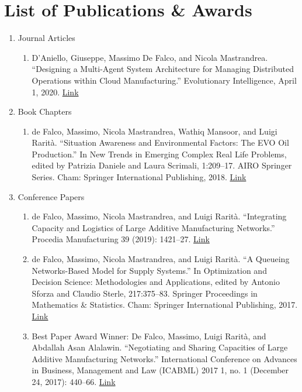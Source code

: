 \chapter*{List of Publications \& Awards}
\begin{enumerate}
    \item Journal Articles
        \begin{enumerate}
            \item D’Aniello, Giuseppe, Massimo De Falco, and Nicola Mastrandrea. “Designing a Multi-Agent System Architecture for Managing Distributed Operations within Cloud Manufacturing.” Evolutionary Intelligence, April 1, 2020. \href{https://doi.org/10.1007/s12065-020-00390-z}{Link}
        \end{enumerate}
    \item Book Chapters
        \begin{enumerate}
            \item de Falco, Massimo, Nicola Mastrandrea, Wathiq Mansoor, and Luigi Rarità. “Situation Awareness and Environmental Factors: The EVO Oil Production.” In New Trends in Emerging Complex Real Life Problems, edited by Patrizia Daniele and Laura Scrimali, 1:209–17. AIRO Springer Series. Cham: Springer International Publishing, 2018. \href{https://doi.org/10.1007/978-3-030-00473-6_23}{Link}
        \end{enumerate}
    \item Conference Papers
        \begin{enumerate}
            \item de Falco, Massimo, Nicola Mastrandrea, and Luigi Rarità. “Integrating Capacity and Logistics of Large Additive Manufacturing Networks.” Procedia Manufacturing 39 (2019): 1421–27. \href{https://doi.org/10.1016/j.promfg.2020.01.310}{Link}
            \item de Falco, Massimo, Nicola Mastrandrea, and Luigi Rarità. “A Queueing Networks-Based Model for Supply Systems.” In Optimization and Decision Science: Methodologies and Applications, edited by Antonio Sforza and Claudio Sterle, 217:375–83. Springer Proceedings in Mathematics \& Statistics. Cham: Springer International Publishing, 2017. \href{https://doi.org/10.1007/978-3-319- 67308-0_38}{Link}
            \item Best Paper Award Winner: De Falco, Massimo, Luigi Rarità, and Abdallah Asan Alalawin. “Negotiating and Sharing Capacities of Large Additive Manufacturing Networks.” International Conference on Advances in Business, Management and Law (ICABML) 2017 1, no. 1 (December 24, 2017): 440–66. \href{https://doi.org/10.30585/icabml-cp.v1i1.37}{Link}
        \end{enumerate}
\end{enumerate}
